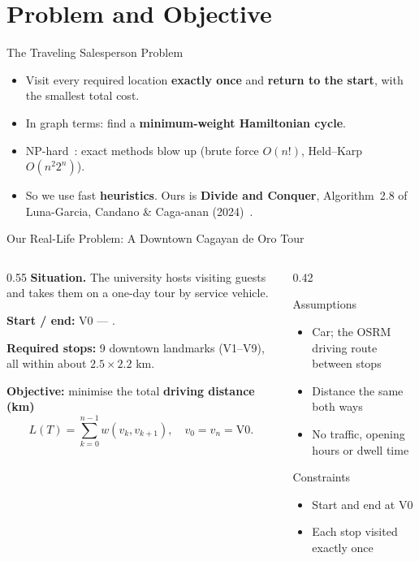 \section{Problem and Objective}

\begin{frame}{The Traveling Salesperson Problem}
  \begin{itemize}
    \item Visit every required location \textbf{exactly once} and \textbf{return to the start},
          with the smallest total cost.
    \item In graph terms: find a \textbf{minimum-weight Hamiltonian cycle}.
    \item NP-hard~\cite{garey1979computers}: exact methods blow up
          (brute force $O(n!)$, Held--Karp $O(n^2 2^n)$).
    \item So we use fast \textbf{heuristics}. Ours is \textbf{Divide and Conquer}, Algorithm~2.8 of
          Luna-Garcia, Candano \& Caga-anan (2024)~\cite{lunagarcia2024performance}.
  \end{itemize}
\end{frame}

\begin{frame}{Our Real-Life Problem: A Downtown Cagayan de Oro Tour}
  \begin{columns}[T]
    \begin{column}{0.55\textwidth}
      \textbf{Situation.} The university hosts visiting guests and takes them on a one-day tour by
      service vehicle.
      \medskip

      \textbf{Start / end:} V0 --- \StartName.

      \textbf{Required stops:} 9 downtown landmarks (V1--V9), all within about $2.5\times2.2$ km.
      \medskip

      \textbf{Objective:} minimise the total \textbf{driving distance (km)}
      \[ L(T) = \sum_{k=0}^{n-1} w(v_k, v_{k+1}),\quad v_0 = v_n = \mathrm{V0}. \]
    \end{column}
    \begin{column}{0.42\textwidth}
      \begin{block}{Assumptions}
        \small
        \begin{itemize}
          \item Car; the OSRM driving route between stops
          \item Distance the same both ways
          \item No traffic, opening hours or dwell time
        \end{itemize}
      \end{block}
      \begin{block}{Constraints}
        \small
        \begin{itemize}
          \item Start and end at V0
          \item Each stop visited exactly once
        \end{itemize}
      \end{block}
    \end{column}
  \end{columns}
\end{frame}
